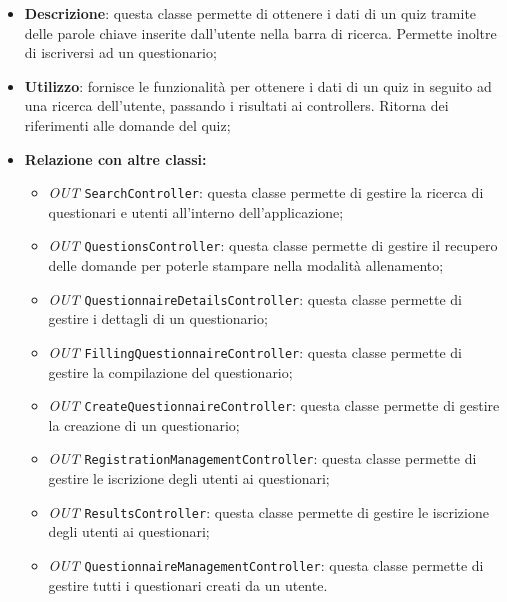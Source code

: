 \begin{itemize}
	\item \textbf{Descrizione}: questa classe permette di ottenere i dati di un quiz tramite delle parole chiave inserite dall'utente nella barra di ricerca. Permette inoltre di iscriversi ad un questionario;
	\item \textbf{Utilizzo}: fornisce le funzionalità per ottenere i dati di un quiz in seguito ad una ricerca dell'utente, passando i risultati ai controllers. Ritorna dei riferimenti alle domande del quiz;
	\item \textbf{Relazione con altre classi:}
	\begin{itemize}
		\item \textit{OUT} \texttt{SearchController}: questa classe permette di gestire la ricerca di questionari e utenti all'interno dell'applicazione;
		\item \textit{OUT} \texttt{QuestionsController}: questa classe permette di gestire il recupero delle domande per poterle stampare nella modalità allenamento;
		\item \textit{OUT} \texttt{QuestionnaireDetailsController}: questa classe permette di gestire i dettagli di un questionario;
		\item \textit{OUT} \texttt{FillingQuestionnaireController}: questa classe permette di gestire la compilazione del questionario;
		\item \textit{OUT} \texttt{CreateQuestionnaireController}: questa classe permette di gestire la creazione di un questionario;
		\item \textit{OUT} \texttt{RegistrationManagementController}: questa classe permette di gestire le iscrizione degli utenti ai questionari;
		\item \textit{OUT} \texttt{ResultsController}: questa classe permette di gestire le iscrizione degli utenti ai questionari; 
		\item \textit{OUT} \texttt{QuestionnaireManagementController}: questa classe permette di gestire tutti i questionari creati da un utente. 
		

\end{itemize}
\end{itemize}
